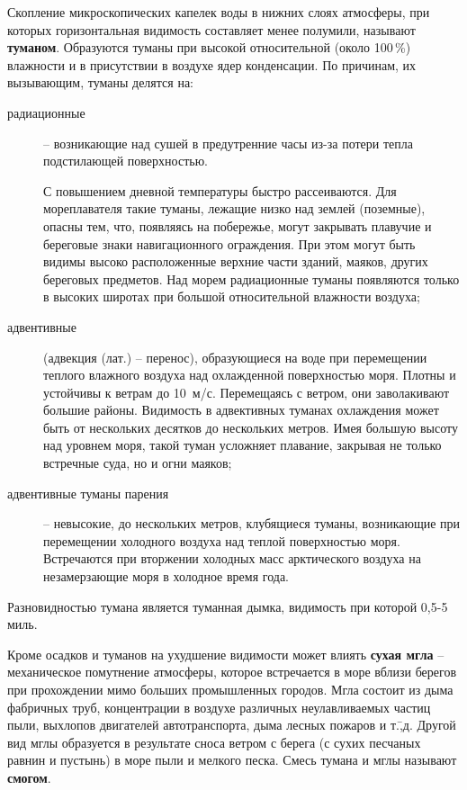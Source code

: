 \documentclass[a4paper, 12pt, twoside, final, book, russian, fittopage, cyremdash]{ncc}
\begin{document}
Скопление микроскопических капелек воды в нижних слоях атмосферы, при которых горизонтальная видимость составляет менее полумили, называют \textbf{туманом}. Образуются туманы при высокой относительной (около 100\,\%) влажности и в присутствии в воздухе ядер конденсации. По причинам, их вызывающим, туманы делятся на:

\begin{description}
\item[радиационные] \--- возникающие над сушей в предутренние часы из-за потери тепла подстилающей поверхностью.

С повышением дневной температуры быстро рассеиваются. Для мореплавателя такие туманы, лежащие низко над землей (поземные), опасны тем, что, появляясь на побережье, могут закрывать плавучие и береговые знаки навигационного ограждения. При этом могут быть видимы высоко расположенные верхние части зданий, маяков, других береговых предметов. Над морем радиационные туманы появляются только в высоких широтах при большой относительной влажности воздуха; 
\item[адвентивные] (адвекция (лат.) \--- перенос), образующиеся на воде при перемещении теплого влажного воздуха над охлажденной поверхностью моря. Плотны и устойчивы к ветрам до 10~м/с. Перемещаясь с ветром, они заволакивают большие районы. Видимость в адвективных туманах охлаждения может быть от нескольких десятков до нескольких метров. Имея большую высоту над уровнем моря, такой туман усложняет плавание, закрывая не только встречные суда, но и огни маяков; 
\item[адвентивные туманы парения] \--- невысокие, до нескольких метров, клубящиеся туманы, возникающие при перемещении холодного воздуха над теплой поверхностью моря. Встречаются при вторжении холодных масс арктического воздуха на незамерзающие моря в холодное время года.
\end{description}

Разновидностью тумана является туманная дымка, видимость при которой 0,5-5 миль. 

Кроме осадков и туманов на ухудшение видимости может влиять \textbf{сухая мгла} \--- механическое помутнение атмосферы, которое встречается в море вблизи берегов при прохождении мимо больших промышленных городов. Мгла состоит из дыма фабричных труб, концентрации в воздухе различных неулавливаемых частиц пыли, выхлопов двигателей автотранспорта, дыма лесных пожаров и т.\=,д. Другой вид мглы образуется в результате сноса ветром с берега (с сухих песчаных равнин и пустынь) в море пыли и мелкого песка. Смесь тумана и мглы называют \textbf{смогом}.
\end{document}
